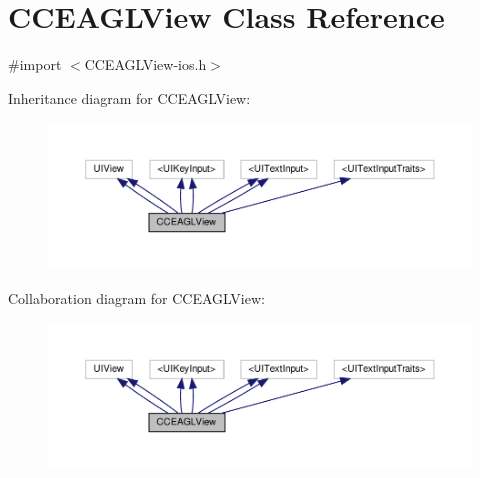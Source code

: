 \hypertarget{interfaceCCEAGLView}{}\section{C\+C\+E\+A\+G\+L\+View Class Reference}
\label{interfaceCCEAGLView}


{\ttfamily \#import $<$C\+C\+E\+A\+G\+L\+View-\/ios.\+h$>$}



Inheritance diagram for C\+C\+E\+A\+G\+L\+View\+:
\nopagebreak
\begin{figure}[H]
\begin{center}
\leavevmode
\includegraphics[width=350pt]{interfaceCCEAGLView__inherit__graph}
\end{center}
\end{figure}


Collaboration diagram for C\+C\+E\+A\+G\+L\+View\+:
\nopagebreak
\begin{figure}[H]
\begin{center}
\leavevmode
\includegraphics[width=350pt]{interfaceCCEAGLView__coll__graph}
\end{center}
\end{figure}

